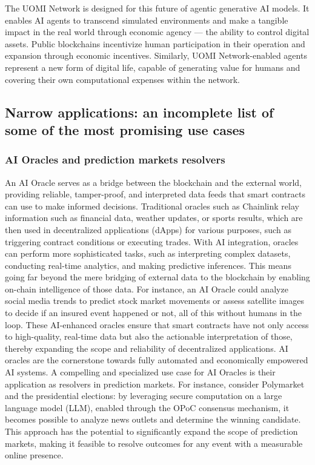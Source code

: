 \documentclass{article}
\begin{document}
The UOMI Network is designed for this future of agentic generative AI models. It enables AI agents to transcend simulated environments and make a tangible impact in the real world through economic agency — the ability to control digital assets. Public blockchains incentivize human participation in their operation and expansion through economic incentives. Similarly, UOMI Network-enabled agents represent a new form of digital life, capable of generating value for humans and covering their own computational expenses within the network.

\subsection{Narrow applications: an incomplete list of some of the most promising use cases
}

\subsubsection{AI Oracles and prediction markets resolvers}

An AI Oracle serves as a bridge between the blockchain and the external world, providing reliable,
tamper-proof, and interpreted data feeds that smart contracts can use to make informed decisions.
Traditional oracles such as Chainlink relay information such as financial data, weather updates, or
sports results, which are then used in decentralized applications (dApps) for various purposes, such
as triggering contract conditions or executing trades. With AI integration, oracles can perform more
sophisticated tasks, such as interpreting complex datasets, conducting real-time analytics, and making
predictive inferences. This means going far beyond the mere bridging of external data to the blockchain
by enabling on-chain intelligence of those data. For instance, an AI Oracle could analyze social media
trends to predict stock market movements or assess satellite images to decide if an insured event
happened or not, all of this without humans in the loop. These AI-enhanced oracles ensure that smart
contracts have not only access to high-quality, real-time data but also the actionable interpretation
of those, thereby expanding the scope and reliability of decentralized applications. AI oracles are
the cornerstone towards fully automated and economically empowered AI systems. A compelling
and specialized use case for AI Oracles is their application as resolvers in prediction markets. For
instance, consider Polymarket and the presidential elections: by leveraging secure computation on a
large language model (LLM), enabled through the OPoC consensus mechanism, it becomes possible
to analyze news outlets and determine the winning candidate. This approach has the potential to
significantly expand the scope of prediction markets, making it feasible to resolve outcomes for any
event with a measurable online presence.
\end{document}
